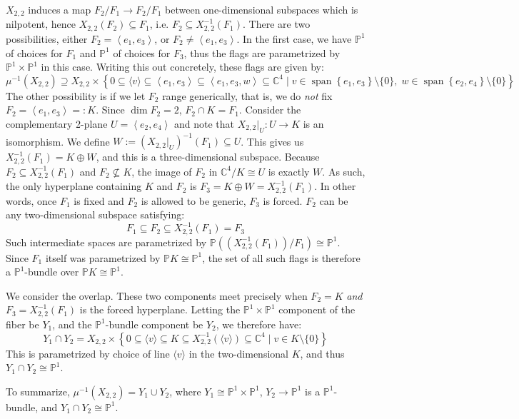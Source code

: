 \documentclass[11pt]{article}
\newcommand{\C}{\mathbb{C}}
\newcommand{\bP}{\mathbb{P}}
\newcommand{\Sp}{\operatorname{span}}
\theoremstyle{definition}
\numberwithin{equation}{section} %
\begin{document}
\begin{example}
    \noindent $X_{2,2}$ induces a map $F_2/F_1\to F_2/F_1$ between one-dimensional subspaces which is nilpotent, hence $X_{2,2}\left(F_2\right) \subseteq F_1$, i.e. $F_2\subseteq X_{2,2}^{-1}\left(F_1\right)$. There are two possibilities, either $F_2 = \left\langle e_1, e_3\right\rangle$, or $F_2 \neq \left\langle e_1, e_3\right\rangle$. In the first case, we have $\bP^1$ of choices for $F_1$ and $\bP^1$ of choices for $F_3$, thus the flags are parametrized by $\bP^1\times \bP^1$ in this case. Writing this out concretely, these flags are given by:
    $$
    \mu^{-1}\left(X_{2,2}\right) \supseteq X_{2,2}\times \left\{ 0\subseteq \langle v\rangle \subseteq \left\langle e_1, e_3\right\rangle \subseteq \left\langle e_1, e_3, w\right\rangle \subseteq \C^4\mid v\in \Sp\left\{e_1, e_3\right\}\setminus\{0\}, \; w\in \Sp\left\{e_2, e_4\right\}\setminus \{0\} \right\}
    $$
    The other possibility is if we let $F_2$ range generically, that is, we do \emph{not} fix $F_2 =\left\langle e_1, e_3\right\rangle =:K$. Since $\dim F_2 = 2$, $F_2\cap K = F_1$. Consider the complementary 2-plane $U = \left\langle e_2, e_4\right\rangle$ and note that $X_{2,2}\vert_U : U\to K$ is an isomorphism. We define $W:=\left(X_{2,2}\vert_U\right)^{-1}\left(F_1\right)\subseteq U$. This gives us $X_{2,2}^{-1}\left(F_1\right) = K\oplus W$, and this is a three-dimensional subspace. Because $F_2\subseteq X_{2,2}^{-1}\left(F_1\right)$ and $F_2\not\subseteq K$, the image of $F_2$ in $\C^4/K \cong U$ is exactly $W$. As such, the only hyperplane containing $K$ and $F_2$ is $F_3 = K\oplus W = X_{2,2}^{-1}\left(F_1\right)$. In other words, once $F_1$ is fixed and $F_2$ is allowed to be generic, $F_3$ is forced. $F_2$ can be any two-dimensional subspace satisfying:
    $$
    F_1 \subseteq F_2\subseteq X_{2,2}^{-1}\left(F_1\right) = F_3
    $$
    Such intermediate spaces are parametrized by $\bP\left(\left(X_{2,2}^{-1}\left(F_1\right)\right)/F_1\right)\cong \bP^1$. Since $F_1$ itself was parametrized by $\bP K \cong \bP^1$, the set of all such flags is therefore a $\bP^1$-bundle over $\bP K\cong \bP^1$.

    \smallskip

    \noindent We consider the overlap. These two components meet precisely when $F_2 = K$ \emph{and} $F_3 = X_{2,2}^{-1}\left(F_1\right)$ is the forced hyperplane. Letting the $\bP^1\times \bP^1$ component of the fiber be $Y_1$, and the $\bP^1$-bundle component be $Y_2$, we therefore have:
    $$
    Y_1\cap Y_2 = X_{2,2} \times \left\{0\subseteq \langle v\rangle \subseteq K\subseteq X_{2,2}^{-1}\left(\langle v\rangle\right)\subseteq \C^4 \mid v\in K \setminus \{0\}\right\}
    $$
    This is parametrized by choice of line $\langle v\rangle$ in the two-dimensional $K$, and thus $Y_1\cap Y_2 \cong \bP^1$. 

    \smallskip

    \noindent To summarize, $\mu^{-1}\left(X_{2,2}\right) = Y_1\cup Y_2$, where $Y_1\cong \bP^1\times \bP^1$, $Y_2\to \bP^1$ is a $\bP^1$-bundle, and $Y_1\cap Y_2 \cong \bP^1$.
\end{example}
\end{document}
